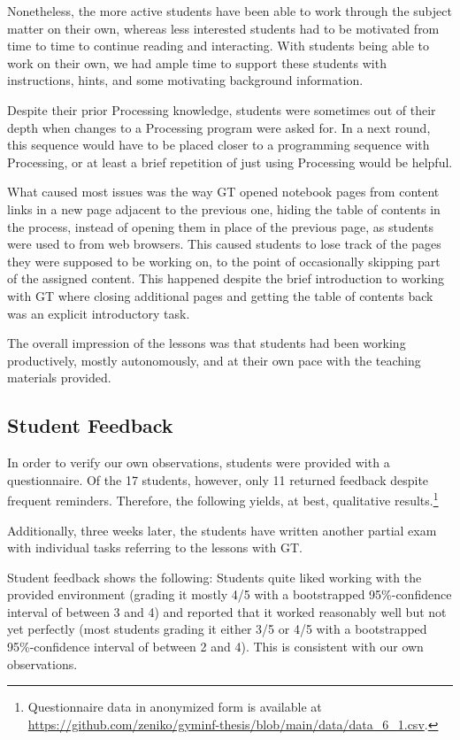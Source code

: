 Nonetheless, the more active students have been able to work through the subject matter on their own, whereas less interested students had to be motivated from time to time to continue reading and interacting. With students being able to work on their own, we had ample time to support these students with instructions, hints, and some motivating background information.

Despite their prior Processing knowledge, students were sometimes out of their depth when changes to a Processing program were asked for. In a next round, this sequence would have to be placed closer to a programming sequence with Processing, or at least a brief repetition of just using Processing would be helpful.

What caused most issues was the way \ac{GT} opened notebook pages from content links in a new page adjacent to the previous one, hiding the table of contents in the process, instead of opening them in place of the previous page, as students were used to from web browsers. This caused students to lose track of the pages they were supposed to be working on, to the point of occasionally skipping part of the assigned content. This happened despite the brief introduction to working with \ac{GT} where closing additional pages and getting the table of contents back was an explicit introductory task.

The overall impression of the lessons was that students had been working productively, mostly autonomously, and at their own pace with the teaching materials provided.


\subsection{Student Feedback}

In order to verify our own observations, students were provided with a questionnaire. Of the 17 students, however, only 11 returned feedback despite frequent reminders. Therefore, the following yields, at best, qualitative results.\footnote{Questionnaire data in anonymized form is available at \url{https://github.com/zeniko/gyminf-thesis/blob/main/data/data_6_1.csv}.}

Additionally, three weeks later, the students have written another partial exam with individual tasks referring to the lessons with \ac{GT}.

Student feedback shows the following: Students quite liked working with the provided environment (grading it mostly 4/5 with a bootstrapped 95\%-confidence interval of between 3 and 4) and reported that it worked reasonably well but not yet perfectly (most students grading it either 3/5 or 4/5 with a bootstrapped 95\%-confidence interval of between 2 and 4). This is consistent with our own observations.

